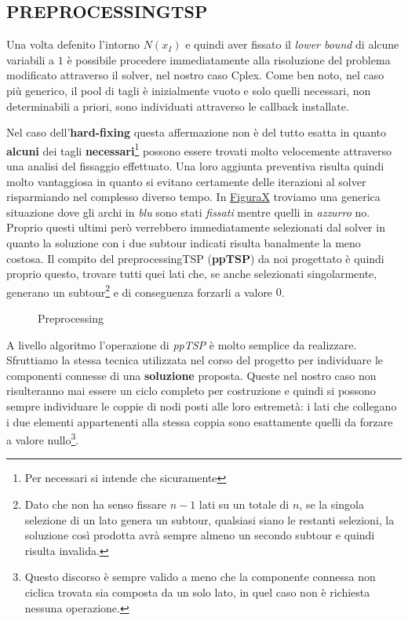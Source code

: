 \documentclass[11pt]{article}
\begin{document}
\subsection*{PREPROCESSINGTSP}
\label{sec:PreProcessingTSPS}

Una volta defenito l'intorno \textbf{$N(x_I)$} e quindi aver fissato il \textit{lower bound} di alcune variabili a $1$ è possibile procedere immediatamente alla risoluzione del problema modificato attraverso il solver, nel nostro caso Cplex. Come ben noto, nel caso più generico, il pool di tagli è inizialmente vuoto e solo quelli necessari, non determinabili a priori, sono individuati attraverso le callback installate.

Nel caso dell'\textbf{hard-fixing} questa affermazione non è del tutto esatta in quanto \textbf{alcuni} dei tagli \textbf{necessari}\footnote{Per necessari si intende che sicuramente } possono essere trovati molto velocemente attraverso una analisi del fissaggio effettuato. Una loro aggiunta preventiva risulta quindi molto vantaggiosa in quanto si evitano certamente delle iterazioni al solver risparmiando nel complesso diverso tempo.
In \hyperref[fig:Preprocessiong1]{FiguraX} troviamo una generica situazione dove gli archi in \textit{blu} sono stati \textit{fissati} mentre quelli in \textit{azzurro} no. Proprio questi ultimi però verrebbero immediatamente selezionati dal solver in quanto la soluzione con i due subtour indicati risulta banalmente la meno costosa. Il compito del preprocessingTSP (\textbf{ppTSP}) da noi progettato è quindi proprio questo, trovare tutti quei lati che, se anche selezionati singolarmente, generano un subtour\footnote{Dato che non ha senso fissare $n-1$ lati su un totale di $n$, se la singola selezione di un lato genera un subtour, qualsiasi siano le restanti selezioni, la soluzione così prodotta avrà sempre almeno un secondo subtour e quindi risulta invalida.} e di conseguenza forzarli a valore $0$.

\begin{figure}[htbp]
    \centering
    \label{fig:Preprocessiong1}
    \caption{Preprocessing}
\end{figure}

A livello algoritmo l'operazione di \textit{ppTSP} è molto semplice da realizzare. Sfruttiamo la stessa tecnica utilizzata nel corso del progetto per individuare le componenti connesse di una \textbf{soluzione} proposta. Queste nel nostro caso non risulteranno mai essere un ciclo completo per costruzione e quindi si possono sempre individuare le coppie di nodi posti alle loro estremetà: i lati che collegano i due elementi appartenenti alla stessa coppia sono esattamente quelli da forzare a valore nullo\footnote{Questo discorso è sempre valido a meno che la componente connessa non ciclica trovata sia composta da un solo lato, in quel caso non è richiesta nessuna operazione.}.
\end{document}
